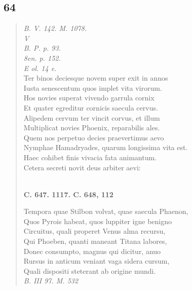 \documentclass[11pt, a4paper]{report}
\begin{document}
            \subsection*{64}
      \begin{verse}
      \textit{B. V. 142. M. 1078.} \\ \textit{V} \\ \textit{B. P. p. 93.} \\ \textit{8en. p. 152.} \\ \textit{E ol. 14 e.} \\ Ter binos deciesque novem super exit in annos \\ Iusta senescentum quos implet vita virorum. \\ Hos novies superat vivendo garrula cornix \\ Et quater egreditur cornicis saecula cervus. \\ Alipedem cervum ter vincit corvus, et illum \\ Multiplicat novies Phoenix, reparabilis ales. \\ Quem nos perpetuo decies praevertimus aevo \\ Nymphae Hamadryades, quarum longissima vita est. \\ Haec cohibet finis vivacia fata animantum. \\ Cetera secreti novit deus arbiter aevi: \\ 
        ﻿\pagebreak 
    \begin{center} \textbf{C. 647. 1117. C. 648, 112} \end{center} \marginpar{[116]} Tempora quae Stilbon volvat, quae saecula Phaenon, \\ Quos Pyrois habeat, quos luppiter igne benigno \\ Circuitus, quali properet Venus alma recursu, \\ Qui Phoeben, quanti maneant Titana labores, \\ Donec consumpto, magnus qui dicitur, anuo \\ Rursus in anticum veniant vaga sidera cursum, \\ Quali dispositi steterant ab origine mundi. \\ \textit{B. III 97. M. 532} \\ 
      \end{verse}
  
\end{document}
